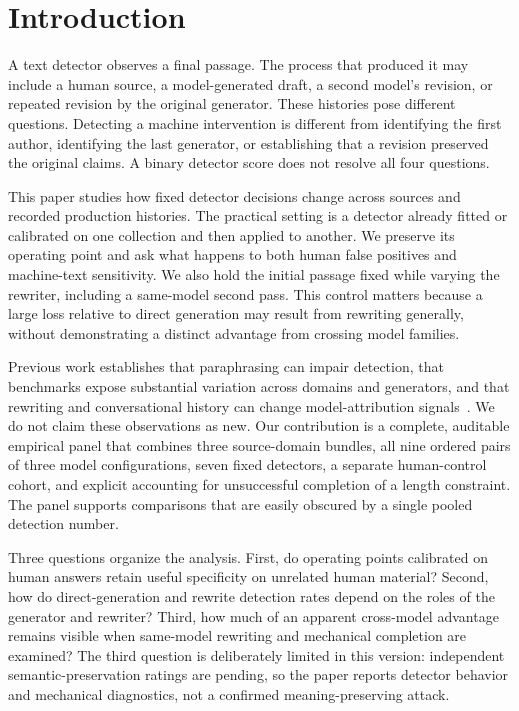 \section{Introduction}
A text detector observes a final passage. The process that produced it may include a human source, a model-generated draft, a second model's revision, or repeated revision by the original generator. These histories pose different questions. Detecting a machine intervention is different from identifying the first author, identifying the last generator, or establishing that a revision preserved the original claims. A binary detector score does not resolve all four questions.

This paper studies how fixed detector decisions change across sources and recorded production histories. The practical setting is a detector already fitted or calibrated on one collection and then applied to another. We preserve its operating point and ask what happens to both human false positives and machine-text sensitivity. We also hold the initial passage fixed while varying the rewriter, including a same-model second pass. This control matters because a large loss relative to direct generation may result from rewriting generally, without demonstrating a distinct advantage from crossing model families.

Previous work establishes that paraphrasing can impair detection, that benchmarks expose substantial variation across domains and generators, and that rewriting and conversational history can change model-attribution signals~\cite{sadasivan2023,dugan2024,perrone2026,yuan2026,tian2026}. We do not claim these observations as new. Our contribution is a complete, auditable empirical panel that combines three source-domain bundles, all nine ordered pairs of three model configurations, seven fixed detectors, a separate human-control cohort, and explicit accounting for unsuccessful completion of a length constraint. The panel supports comparisons that are easily obscured by a single pooled detection number.

Three questions organize the analysis. First, do operating points calibrated on human answers retain useful specificity on unrelated human material? Second, how do direct-generation and rewrite detection rates depend on the roles of the generator and rewriter? Third, how much of an apparent cross-model advantage remains visible when same-model rewriting and mechanical completion are examined? The third question is deliberately limited in this version: independent semantic-preservation ratings are pending, so the paper reports detector behavior and mechanical diagnostics, not a confirmed meaning-preserving attack.

